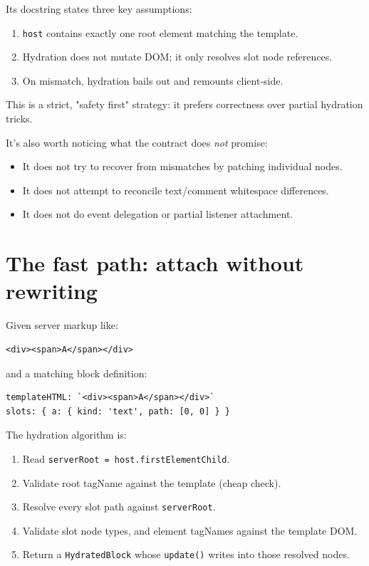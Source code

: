 Its docstring states three key assumptions:

\begin{enumerate}
  \item \texttt{host} contains exactly one root element matching the template.
  \item Hydration does not mutate DOM; it only resolves slot node references.
  \item On mismatch, hydration bails out and remounts client-side.
\end{enumerate}

This is a strict, "safety first" strategy: it prefers correctness over partial hydration tricks.

It’s also worth noticing what the contract does \emph{not} promise:

\begin{itemize}
  \item It does not try to recover from mismatches by patching individual nodes.
  \item It does not attempt to reconcile text/comment whitespace differences.
  \item It does not do event delegation or partial listener attachment.
\end{itemize}

\section{The fast path: attach without rewriting}

Given server markup like:

\begin{verbatim}
<div><span>A</span></div>
\end{verbatim}

and a matching block definition:

\begin{verbatim}
templateHTML: `<div><span>A</span></div>`
slots: { a: { kind: 'text', path: [0, 0] } }
\end{verbatim}

The hydration algorithm is:

\begin{enumerate}
  \item Read \texttt{serverRoot = host.firstElementChild}.
  \item Validate root tagName against the template (cheap check).
  \item Resolve every slot path against \texttt{serverRoot}.
  \item Validate slot node types, and element tagNames against the template DOM.
  \item Return a \texttt{HydratedBlock} whose \texttt{update()} writes into those resolved nodes.
\end{enumerate}

